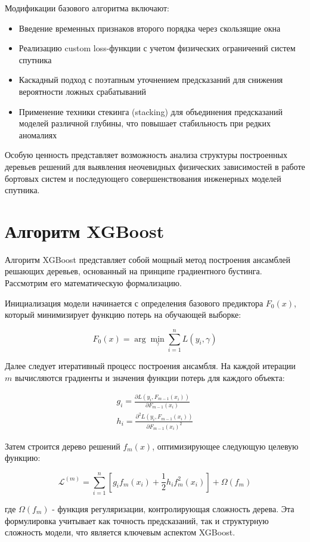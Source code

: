 Модификации базового алгоритма включают:
\begin{itemize}
	\item Введение временных признаков второго порядка через скользящие окна
	\item Реализацию custom loss-функции с учетом физических ограничений систем спутника
	\item Каскадный подход с поэтапным уточнением предсказаний для снижения вероятности ложных срабатываний
	\item Применение техники стекинга (stacking) для объединения предсказаний моделей различной глубины, что повышает стабильность при редких аномалиях
\end{itemize}

Особую ценность представляет возможность анализа структуры построенных деревьев решений для выявления неочевидных физических зависимостей в работе бортовых систем и последующего совершенствования инженерных моделей спутника.


\section{Алгоритм XGBoost}

Алгоритм XGBoost представляет собой мощный метод построения ансамблей решающих
деревьев, основанный на принципе градиентного бустинга. Рассмотрим его
математическую формализацию.

Инициализация модели начинается с определения базового предиктора $F_0(x)$,
который минимизирует функцию потерь на обучающей выборке:

\[F_0(x) = \arg \min_{\gamma} \sum_{i=1}^n L(y_i, \gamma)\]

Далее следует итеративный процесс построения ансамбля. На каждой итерации $m$
вычисляются градиенты и значения функции потерь для каждого объекта:

\begin{gather*}
	g_i = \frac{\partial L(y_i, F_{m-1}(x_i))}{\partial F_{m-1}(x_i)}\\
	h_i = \frac{\partial^2 L(y_i, F_{m-1}(x_i))}{\partial F_{m-1}(x_i)^2}
\end{gather*}

Затем строится дерево решений $f_m(x)$, оптимизирующее следующую целевую функцию:

\[\mathcal{L}^{(m)} = \sum_{i=1}^n \left[ g_i f_m(x_i) + \frac{1}{2} h_i f_m^2(x_i) \right] + \Omega(f_m)\]

где $\Omega(f_m)$ - функция регуляризации, контролирующая сложность дерева. Эта
формулировка учитывает как точность предсказаний, так и структурную сложность
модели, что является ключевым аспектом XGBoost.


